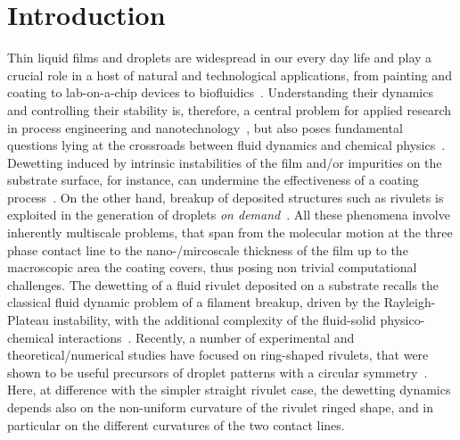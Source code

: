 \documentclass[twoside,twocolumn,9pt]{article}
\begin{document}

\section{Introduction}
\label{sec:intro}
Thin liquid films and droplets are widespread in our every day life and play a crucial role in a host of natural and technological applications, from painting and coating to lab-on-a-chip devices to biofluidics~\cite{degennesCapillarityWettingPhenomena2004, ronsinPhaseFieldSimulationsMorphology2022,fockeLabonaFoilMicrofluidicsThin2010}.
Understanding their dynamics and controlling their stability is, therefore, a central problem for applied research in process engineering and nanotechnology~\cite{singhInkjetPrintingProcess2010, quereFluidCoatingFiber1999, utadaDrippingJettingDrops2007}, but also poses fundamental questions lying at the crossroads between fluid dynamics and chemical physics~\cite{oronLongscaleEvolutionThin1997, beckerComplexDewettingScenarios2003, thielePatternedDepositionMoving2014, wilczekSlidingDropsEnsemble2017, peschkaSignaturesSlipDewetting2019}.
Dewetting induced by intrinsic instabilities of the film and/or impurities on the substrate surface, for instance, can undermine the effectiveness of a coating process~\cite{bonnWettingSpreading2009, chenWrinklingInstabilitiesPolymer2012}. 
On the other hand, breakup of deposited structures such as rivulets is exploited in the generation of droplets {\it on demand}~\cite{nguyenCompetitionCollapseBreakup2012, PhysRevLett.133.214003}.
All these phenomena involve inherently multiscale problems, that span from the molecular motion at the three phase contact line to the nano-/mircoscale thickness of the film up to the macroscopic area the coating covers, thus posing non trivial computational challenges.
The dewetting of a fluid rivulet deposited on a substrate recalls the classical fluid dynamic problem of a filament breakup, driven by the Rayleigh-Plateau instability, with the additional complexity of the fluid-solid physico-chemical interactions~\cite{diezBreakupFluidRivulets2009, diezStabilityFinitelengthRivulet2009, diezInstabilityTransverseLiquid2012}.
Recently,  a number of experimental and theoretical/numerical studies have focused on ring-shaped rivulets, that were shown to be useful precursors of droplet patterns with a circular symmetry~\cite{nguyenCompetitionCollapseBreakup2012, gonzalezStabilityLiquidRing2013, wuCompetingLiquidPhase2011, edwardsControllingBreakupToroidal2021}. 
Here, at difference with the simpler straight rivulet case, the dewetting dynamics depends also on the non-uniform curvature of the rivulet ringed shape, and in particular on the different curvatures of the two contact lines.
\end{document}
